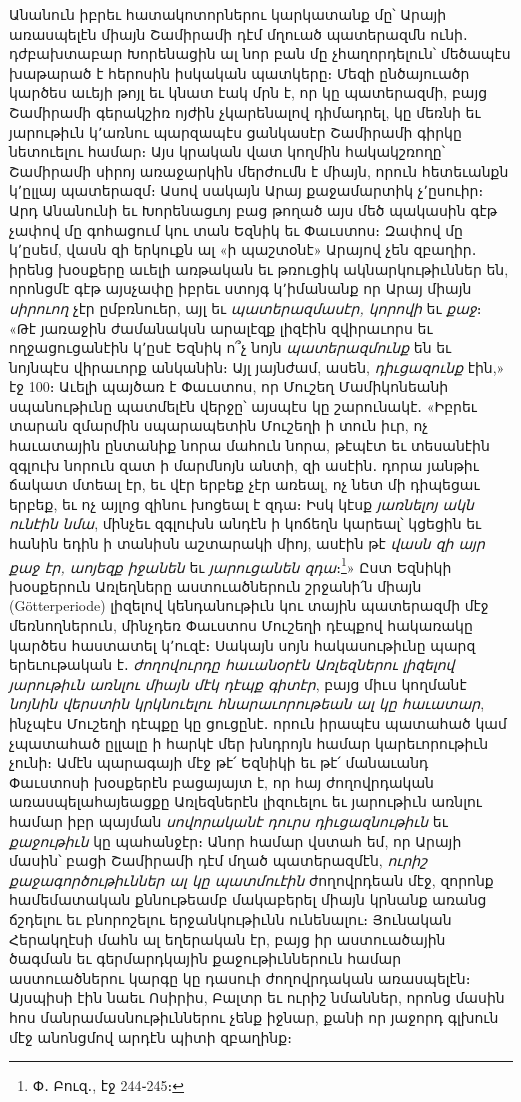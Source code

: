 \documentclass{article}
\begin{document}
{Անանուն իբրեւ հատակոտորներու կարկատանք մը՝ Արայի առասպելէն միայն Շամիրամի դէմ մղուած պատերազմն ունի․ դժբախտաբար Խորենացին ալ նոր բան մը չհաղորդելուն՝ մեծապէս խաթարած է հերոսին իսկական պատկերը։ Մեզի ընծայուածր կարծես աւեյի թոյլ եւ կնատ էակ մրն է, որ կը պատերազմի, բայց Շամիրամի գերակշիռ ոյժին չկարենալով դիմադրել, կը մեռնի եւ յարութիւն կ՚առնու պարզապէս ցանկասէր Շամիրամի գիրկը նետուելու համար։ Այս կրական վատ կողմին հակակշռողը՝ Շամիրամի սիրոյ առաջարկին մերժումն է միայն, որուն հետեւանքն կ՚ըլլայ պատերազմ։ Ասով սակայն Արայ քաջամարտիկ չ՚ըսուիր։ Արդ Անանունի եւ Խորենացւոյ բաց թողած այս մեծ պակասին գէթ չափով մը գոհացում կու տան Եզնիկ եւ Փաւստոս։ Զափով մը կ՚ըսեմ, վասն զի երկուքն ալ «ի պաշտօնէ» Արայով չեն զբաղիր․ իրենց խօսքերը աւելի առթական եւ թռուցիկ ակնարկութիւններ են, որոնցմէ գէթ այսչափը իբրեւ ստոյգ կ՚իմանանք որ Արայ միայն \emph{սիրուող} չէր ըմբռնուեր, այլ եւ \emph{պատերազմասէր, կորովի} եւ \emph{քաջ}։ «Թէ յառաջին ժամանակսն արալէզք լիզէին զվիրաւորս եւ ողջացուցանէին կ՚ըսէ Եզնիկ ո՞չ նոյն \emph{պատերազմունք} են եւ նոյնպէս վիրաւորք անկանին։ Այլ յայնժամ, ասեն, \emph{դիւցազունք} էին,» էջ 100։ Աւելի պայծառ է Փաւստոս, որ Մուշեղ Մամիկոնեանի սպանութիւնը պատմելէն վերջը՝ այսպէս կը շարունակէ․ «Իբրեւ տարան զմարմին սպարապետին Մուշեղի ի տուն իւր, ոչ հաւատային ընտանիք նորա մահուն նորա, թէպէտ եւ տեսանէին զգլուխ նորուն զատ ի մարմնոյն անտի, զի ասէին․ դորա յանթիւ ճակատ մտեալ էր, եւ վէր երբեք չէր առեալ, ոչ նետ մի դիպեցաւ երբեք, եւ ոչ այլոց զինու խոցեալ է զդա։ Իսկ կէսք \emph{յառնելոյ ակն ունէին նմա}, մինչեւ զգլուխն անդէն ի կոճեղն կարեալ՝ կցեցին եւ հանին եդին ի տանիսն աշտարակի միոյ, ասէին թէ \emph{վասն զի այր քաջ էր, աոյեզք իջանեն} եւ \emph{յարուցանեն զդա}։\footnote{Փ․ Բուզ․, էջ 244֊245։}» Ըստ Եզնիկի խօսքերուն Առլեղները աստուածներուն շրջանի՛ն միայն (Götterperiode) լիզելով կենդանութիւն կու տային պատերազմի մէջ մեռնողներուն, մինչդեռ Փաւստոս Մուշեղի դէպքով հակառակը կարծես հաստատել կ՚ուզէ։ Սակայն սոյն հակասութիւնը պարզ երեւութական է․ \emph{ժողովուրդը հաւանօրէն Առլեզներու լիզելով յարութիւն առնլու միայն մէկ դէպք գիտէր}, բայց միւս կողմանէ \emph{նոյնին վերստին կրկնուելու հնարաւորութեան ալ կը հաւատար}, ինչպէս Մուշեղի դէպքը կը ցուցընէ․ որուն իրապէս պատահած կամ չպատահած ըլլալը ի հարկէ մեր խնդրոյն համար կարեւորութիւն չունի։ Ամէն պարագայի մէջ թէ՛ Եզնիկի եւ թէ՛ մանաւանդ Փաւստոսի խօսքերէն բացայայտ է, որ հայ ժողովրդական առասպելահայեացքը Առլեզներէն լիզուելու եւ յարութիւն առնլու համար իբր պայման \emph{սովորականէ դուրս դիւցազնութիւն} եւ \emph{քաջութիւն} կը պահանջէր։ Անոր համար վստահ եմ, որ Արայի մասին՝ բացի Շամիրամի դէմ մղած պատերազմէն, \emph{ուրիշ քաջագործութիւններ ալ կը պատմուէին} ժողովրդեան մէջ, զորոնք համեմատական քննութեամբ մակաբերել միայն կրնանք առանց ճշդելու եւ բնորոշելու երջանկութիւնն ունենալու։ Յունական Հերակղէսի մահն ալ եղերական էր, բայց իր աստուածային ծագման եւ գերմարդկային քաջութիւններուն համար աստուածներու կարգը կը դասուի ժողովրդական առասպելէն։ Այսպիսի էին նաեւ Ոսիրիս, Բալտր եւ ուրիշ նմաններ, որոնց մասին հոս մանրամասնութիւններու չենք իջնար, քանի որ յաջորդ գլխուն մէջ անոնցմով արդէն պիտի զբաղինք։

}
\end{document}
